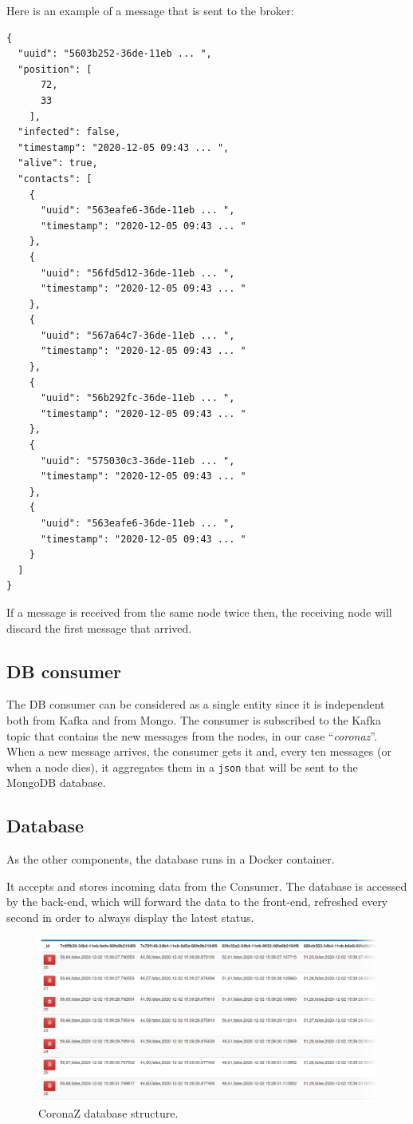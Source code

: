 \documentclass[conference]{IEEEtran}
\begin{document}
		Here is an example of a message that is sent to the broker:
		\begin{verbatim}
{
  "uuid": "5603b252-36de-11eb ... ",
  "position": [
      72,
      33
    ],
  "infected": false,
  "timestamp": "2020-12-05 09:43 ... ",
  "alive": true,
  "contacts": [
    {
      "uuid": "563eafe6-36de-11eb ... ",
      "timestamp": "2020-12-05 09:43 ... "
    },
    {
      "uuid": "56fd5d12-36de-11eb ... ",
      "timestamp": "2020-12-05 09:43 ... "
    },
    {
      "uuid": "567a64c7-36de-11eb ... ",
      "timestamp": "2020-12-05 09:43 ... "
    },
    {
      "uuid": "56b292fc-36de-11eb ... ",
      "timestamp": "2020-12-05 09:43 ... "
    },
    {
      "uuid": "575030c3-36de-11eb ... ",
      "timestamp": "2020-12-05 09:43 ... "
    },
    {
      "uuid": "563eafe6-36de-11eb ... ",
      "timestamp": "2020-12-05 09:43 ... "
    }
  ]
}
		\end{verbatim}
		
		If a message is received from the same node twice then, the receiving node will discard the first message that arrived.
	
	\subsection{DB consumer}
	
		The DB consumer can be considered as a single entity since it is independent both from Kafka and from Mongo.
		The consumer is subscribed to the Kafka topic that contains the new messages from the nodes, in our case ``\textit{coronaz}''.
		When a new message arrives, the consumer gets it and, every ten messages (or when a node dies), it aggregates them in a \texttt{json} that will be sent to the MongoDB database.
	
	\subsection{Database}
	
		As the other components, the database runs in a Docker container.
		
		It accepts and stores incoming data from the Consumer.
		The database is accessed by the back-end, which will forward the data to the front-end, refreshed every second in order to always display the latest status.
	
		\begin{figure}[htbp]
			\centerline{\includegraphics[width=\linewidth]{img/database.png}}
			\caption{CoronaZ database structure.}
			\label{fig:database}
		\end{figure}
	
\end{document}
